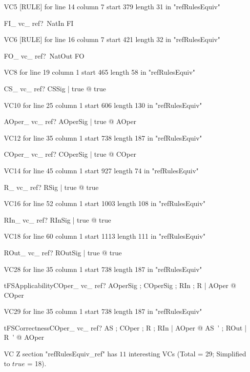 \documentclass{article}
\begin{document}
VC5 [RULE] for line 14 column 7 start 379 length 31 in "refRulesEquiv"
\begin{theorem}{FI\_ vc\_ ref}\vdash ?~NatIn \in \nat \inj FI
\end{theorem}

VC6 [RULE] for line 16 column 7 start 421 length 32 in "refRulesEquiv"
\begin{theorem}{FO\_ vc\_ ref}\vdash ?~NatOut \in \nat \inj FO
\end{theorem}

VC8 for line 19 column 1 start 465 length 58 in "refRulesEquiv"
\begin{theorem}{CS\_ vc\_ ref}\vdash ? \exists CSSig | true @ true
\end{theorem}

VC10 for line 25 column 1 start 606 length 130 in "refRulesEquiv"
\begin{theorem}{AOper\_ vc\_ ref}\vdash ? \forall AOperSig | true @ \pre AOper
\end{theorem}

VC12 for line 35 column 1 start 738 length 187 in "refRulesEquiv"
\begin{theorem}{COper\_ vc\_ ref}\vdash ? \forall COperSig | true @ \pre COper
\end{theorem}

VC14 for line 45 column 1 start 927 length 74 in "refRulesEquiv"
\begin{theorem}{R\_ vc\_ ref}\vdash ? \exists RSig | true @ true
\end{theorem}

VC16 for line 52 column 1 start 1003 length 108 in "refRulesEquiv"
\begin{theorem}{RIn\_ vc\_ ref}\vdash ? \exists RInSig | true @ true
\end{theorem}

VC18 for line 60 column 1 start 1113 length 111 in "refRulesEquiv"
\begin{theorem}{ROut\_ vc\_ ref}\vdash ? \exists ROutSig | true @ true
\end{theorem}

VC28 for line 35 column 1 start 738 length 187 in "refRulesEquiv"
\begin{theorem}{tFSApplicabilityCOper\_ vc\_ ref}\vdash ? \forall AOperSig ; COperSig ; RIn ; R | \pre \pre AOper @ \pre COper
\end{theorem}

VC29 for line 35 column 1 start 738 length 187 in "refRulesEquiv"
\begin{theorem}{tFSCorrectnessCOper\_ vc\_ ref}\vdash ? \forall AS ; COper ; R ; RIn | \pre AOper @ \exists AS~' ; ROut | R~' @ AOper
\end{theorem}



 VC Z section "refRulesEquiv_ref" has $11$ interesting VCs (Total = 29; Simplified to $true$ = 18).



\end{document}
